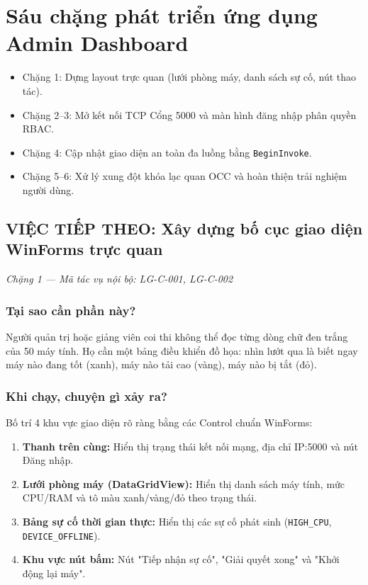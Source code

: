 \documentclass[12pt,a4paper]{article}
\begin{document}
\section{Sáu chặng phát triển ứng dụng Admin Dashboard}

\begin{summarybox}
\begin{itemize}[leftmargin=1.5em, itemsep=1pt]
  \item Chặng 1: Dựng layout trực quan (lưới phòng máy, danh sách sự cố, nút thao tác).
  \item Chặng 2--3: Mở kết nối TCP Cổng 5000 và màn hình đăng nhập phân quyền RBAC.
  \item Chặng 4: Cập nhật giao diện an toàn đa luồng bằng \texttt{BeginInvoke}.
  \item Chặng 5--6: Xử lý xung đột khóa lạc quan OCC và hoàn thiện trải nghiệm người dùng.
\end{itemize}
\end{summarybox}

\subsection{VIỆC TIẾP THEO: Xây dựng bố cục giao diện WinForms trực quan}
{\footnotesize\color{lgGray}\textit{Chặng 1 — Mã tác vụ nội bộ: LG-C-001, LG-C-002}}\par
\vspace{2mm}

\subsubsection{Tại sao cần phần này?}
Người quản trị hoặc giảng viên coi thi không thể đọc từng dòng chữ đen trắng của 50 máy tính. Họ cần một bảng điều khiển đồ họa: nhìn lướt qua là biết ngay máy nào đang tốt (xanh), máy nào tải cao (vàng), máy nào bị tắt (đỏ).

\subsubsection{Khi chạy, chuyện gì xảy ra?}
Bố trí 4 khu vực giao diện rõ ràng bằng các Control chuẩn WinForms:
\begin{enumerate}
  \item \textbf{Thanh trên cùng:} Hiển thị trạng thái kết nối mạng, địa chỉ IP:5000 và nút Đăng nhập.
  \item \textbf{Lưới phòng máy (DataGridView):} Hiển thị danh sách máy tính, mức CPU/RAM và tô màu xanh/vàng/đỏ theo trạng thái.
  \item \textbf{Bảng sự cố thời gian thực:} Hiển thị các sự cố phát sinh (\texttt{HIGH\_CPU}, \texttt{DEVICE\_OFFLINE}).
  \item \textbf{Khu vực nút bấm:} Nút "Tiếp nhận sự cố", "Giải quyết xong" và "Khởi động lại máy".
\end{enumerate}
\end{document}
